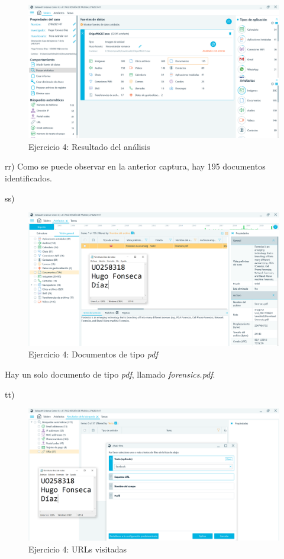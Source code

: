 \documentclass[11pt]{article}
\begin{document}
\begin{figure}[H]
    \caption{Ejercicio 4: Resultado del análisis}
    \centering
    \includegraphics[scale=0.4]{p04/e7-9.PNG}
\end{figure}

rr) Como se puede observar en la anterior captura, hay 195 documentos identificados.

ss) 

\begin{figure}[H]
    \caption{Ejercicio 4: Documentos de tipo \textit{pdf}}
    \centering
    \includegraphics[scale=0.4]{p04/e7-10.PNG}
\end{figure}

Hay un solo documento de tipo \textit{pdf}, llamado \textit{forensics.pdf}.

tt)

\begin{figure}[H]
    \caption{Ejercicio 4: URLs visitadas}
    \centering
    \includegraphics[scale=0.4]{p04/e7-11.PNG}
\end{figure}
\end{document}
